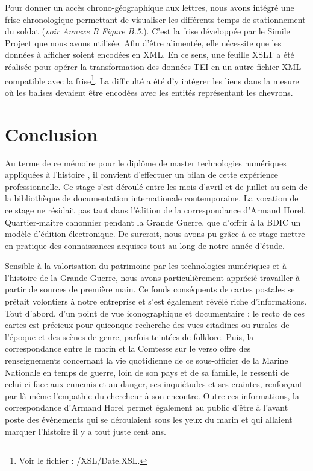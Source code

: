 \documentclass[12pt,a4paper]{book} %
\begin{document}
Pour donner un accès chrono-géographique aux lettres, nous avons intégré une frise chronologique permettant de visualiser les différents temps de stationnement du soldat (\textit{voir Annexe B Figure B.5.}). C'est la frise développée par le Simile Project que nous avons utilisée. Afin d'être alimentée, elle nécessite que les données à afficher soient  encodées en XML. En ce sens, une feuille XSLT a été réalisée pour opérer la transformation des données TEI en un autre fichier XML compatible avec la frise\footnote{Voir le fichier : /XSL/Date.XSL.}. La difficulté a été d'y intégrer les liens dans la mesure où les balises devaient être encodées avec les entités représentant les chevrons. 


\thispagestyle{empty}

\cleardoublepage

\section*{Conclusion}

Au terme de ce mémoire pour le diplôme de master \og technologies numériques appliquées à l'histoire \fg{}, il convient d'effectuer un bilan de cette expérience professionnelle. Ce stage s'est déroulé entre les mois d'avril et de juillet au sein de la bibliothèque de documentation internationale contemporaine. La vocation de ce stage ne résidait pas tant dans l'édition de la correspondance d'Armand Horel, Quartier-maitre canonnier pendant la Grande Guerre, que d'offrir à la BDIC un modèle d'édition électronique. De surcroit, nous avons pu grâce à ce stage mettre en pratique des connaissances acquises tout au long de notre année d'étude. 

Sensible à la valorisation du patrimoine par les technologies numériques et à l'histoire de la Grande Guerre, nous avons particulièrement apprécié travailler à partir de sources de première main. Ce fonds conséquents de cartes postales se prêtait volontiers à notre entreprise et s'est également révélé riche d'informations. Tout d'abord, d'un point de vue iconographique et documentaire ; le recto de ces cartes est précieux pour quiconque recherche des vues citadines ou rurales de l'époque et des scènes de genre, parfois teintées de folklore. Puis, la correspondance entre le marin et la Comtesse sur le verso offre des renseignements concernant la vie quotidienne de ce sous-officier de la Marine Nationale en temps de guerre, loin de son pays et de sa famille, le ressenti de celui-ci face aux ennemis et au danger, ses inquiétudes et ses craintes, renforçant par là même l'empathie du chercheur à son encontre. Outre ces informations, la correspondance d'Armand Horel permet également au public d'être à l'avant poste des évènements qui se déroulaient sous les yeux du marin et qui allaient marquer l'histoire il y a tout juste cent ans. 
\end{document}
